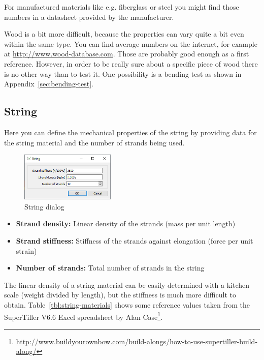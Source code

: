 \documentclass[12pt]{article}
\begin{document}
For manufactured materials like e.g. fiberglass or steel you might find those numbers in a datasheet provided by the manufacturer.

Wood is a bit more difficult, because the properties can vary quite a bit even within the same type.
You can find average numbers on the internet, for example at \url{http://www.wood-database.com}.
Those are probably good enough as a first reference.
However, in order to be really sure about a specific piece of wood there is no other way than to test it.
One possibility is a bending test as shown in Appendix~\ref{sec:bending-test}.

\newpage
\subsection{String}

Here you can define the mechanical properties of the string by providing data for the string material and the number of strands being used.

\begin{figure}[H]
\centering
\includegraphics[width=0.4\textwidth]{figures/screenshots/input/string}
\caption{String dialog}
\label{fig:string}
\end{figure}

\begin{itemize}
\item \textbf{Strand density:} Linear density of the strands (mass per unit length)
\item \textbf{Strand stiffness:} Stiffness of the strands against elongation (force per unit strain)
\item \textbf{Number of strands:} Total number of strands in the string
\end{itemize}

The linear density of a string material can be easily determined with a kitchen scale (weight divided by length), but the stiffness is much more difficult to obtain.
Table~\ref{tbl:string-materials} shows some reference values taken from the SuperTiller V6.6 Excel spreadsheet by Alan Case\footnote{\url{http://www.buildyourownbow.com/build-alongs/how-to-use-supertiller-build-along/}}.
\end{document}
